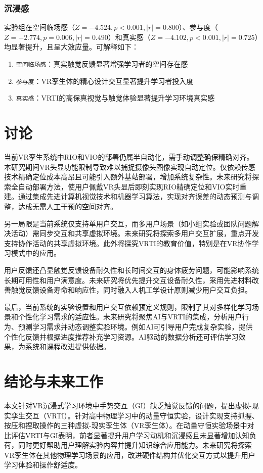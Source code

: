 \documentclass[runningheads]{llncs}
\begin{document}
\subsubsection{沉浸感}
实验组在空间临场感（$Z=-4.524, p<0.001, |r|=0.800$）、参与度（$Z=-2.774, p=0.006, |r|=0.490$）和真实感（$Z=-4.102, p<0.001, |r|=0.725$）均显著提升，且呈大效应量。可解释如下：
\begin{enumerate}
  \item {\texttt{空间临场感}}：真实触觉反馈显著增强学习者的空间存在感
  \item {\texttt{参与度}}：VR孪生体的精心设计交互显著提升学习者投入度
  \item {\texttt{真实感}}：VRTI的高保真视觉与触觉体验显著提升学习环境真实感
\end{enumerate}

\section{讨论}
当前VR孪生系统中RIO和VIO的部署仍属半自动化，需手动调整确保精确对齐。本研究期间VR头显功能限制导致难以捕捉摄像头图像实现自动定位。仅依赖传感技术精确定位成本高昂且可能引入额外基站部署，增加系统复杂性。未来研究将探索全自动部署方法，使用户佩戴VR头显后即刻实现RIO精确定位和VIO实时重建。通过集成先进计算机视觉技术和机器学习算法，实现对齐误差的动态预测与调整，达成无需人工干预的空间对齐。

另一局限是当前系统仅支持单用户交互，而多用户场景（如小组实验或团队问题解决活动）需同步交互和共享虚拟环境。未来研究将探索多用户交互扩展，重点开发支持协作活动的共享虚拟环境。此外将探究VRTI的教育价值，特别是在VR协作学习模式中的应用。

用户反馈还凸显触觉反馈设备耐久性和长时间交互的身体疲劳问题，可能影响系统长期可用性和用户满意度。未来研究将优先提升交互设备耐久性，采用先进材料改善触觉反馈设备寿命和响应性，同时融入人机工学设计原则减少用户交互负担。

最后，当前系统的实验设置和用户交互依赖预定义规则，限制了其对多样化学习场景和个性化学习需求的适应性。未来研究将聚焦AI与VRTI的集成，分析用户行为、预测学习需求并动态调整实验环境。例如AI可引导用户完成复杂实验，提供个性化反馈并根据进度推荐补充学习资源。AI驱动的数据分析还可评估学习效果，为系统和课程改进提供依据。

\section{结论与未来工作}
本文针对VR沉浸式学习环境中手势交互（GI）缺乏触觉反馈的问题，提出虚拟-现实孪生交互（VRTI）。针对高中物理学习中的动量守恒实验，设计实现支持抓握、按压和捏取操作的三种虚拟-现实孪生体（VR孪生体）。在动量守恒实验场景中对比评估VRTI与GI表明，前者显著提升用户学习动机和沉浸感且未显著增加认知负荷，同时更好帮助用户理解实验内容并提升知识综合应用能力。未来研究将探索VR孪生体在其他物理学习场景的应用，改进硬件结构并优化交互方式以提升用户学习体验和操作舒适度。
\end{document}
